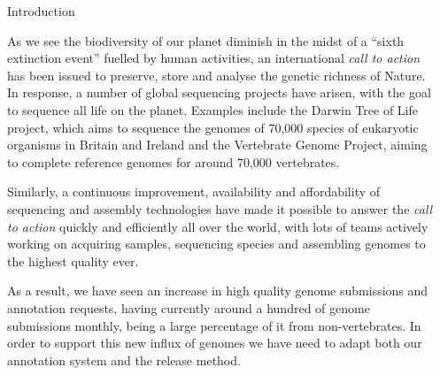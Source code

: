 \documentclass[final]{beamer}
\newlength{\sepwidth}
\newlength{\colwidth}
\newcommand{\separatorcolumn}{\begin{column}{\sepwidth}\end{column}}
\begin{document}
\begin{frame}[t]

\begin{columns}[t]
\separatorcolumn
\begin{column}{\colwidth}

\begin{block}{Introduction}

As we see the biodiversity of our planet diminish in the midst of a “sixth extinction event” fuelled by human activities, an international \textit{call to action} has been issued to preserve, store and analyse the genetic richness of Nature.
In response, a number of global sequencing projects have arisen, with the goal to sequence all life on the planet.
Examples include the Darwin Tree of Life project, which aims to sequence the genomes of 70,000 species of eukaryotic organisms in Britain and Ireland and the Vertebrate Genome Project, aiming to complete reference genomes for around 70,000 vertebrates.

Similarly, a continuous improvement, availability and affordability of sequencing and assembly technologies have made it possible to answer the \textit{call to action} quickly and efficiently all over the world, with lots of teams actively working on acquiring samples, sequencing species and assembling genomes to the highest quality ever.

As a result, we have seen an increase in high quality genome submissions and annotation requests, having currently around a hundred of genome submissions monthly, being a large percentage of it from non-vertebrates.
In order to support this new influx of genomes we have need to adapt both our annotation system and the release method.


\end{block}
\end{column}
\end{columns}
\end{frame}
\end{document}
